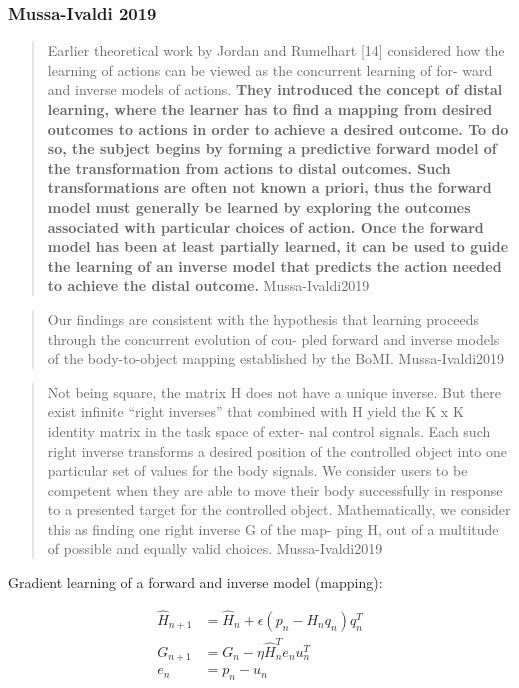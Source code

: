 \documentclass[../main.tex]{subfiles}
\begin{document}
{{{{{{{{{{{\subsubsection{Mussa-Ivaldi 2019}\label{mussa-ivaldi-2019}

\begin{quote}
Earlier theoretical work by Jordan and Rumelhart {[}14{]} considered how
the learning of actions can be viewed as the concurrent learning of for-
ward and inverse models of actions. \textbf{They introduced the concept
of distal learning, where the learner has to find a mapping from desired
outcomes to actions in order to achieve a desired outcome. To do so, the
subject begins by forming a predictive forward model of the
transformation from actions to distal outcomes. Such transformations are
often not known a priori, thus the forward model must generally be
learned by exploring the outcomes associated with particular choices of
action. Once the forward model has been at least partially learned, it
can be used to guide the learning of an inverse model that predicts the
action needed to achieve the distal outcome.} Mussa-Ivaldi2019
\end{quote}

\begin{quote}
Our findings are consistent with the hypothesis that learning proceeds
through the concurrent evolution of cou- pled forward and inverse models
of the body-to-object mapping established by the BoMI. Mussa-Ivaldi2019
\end{quote}

\begin{quote}
Not being square, the matrix H does not have a unique inverse. But there
exist infinite ``right inverses'' that combined with H yield the K x K
identity matrix in the task space of exter- nal control signals. Each
such right inverse transforms a desired position of the controlled
object into one particular set of values for the body signals. We
consider users to be competent when they are able to move their body
successfully in response to a presented target for the controlled
object. Mathematically, we consider this as finding one right inverse G
of the map- ping H, out of a multitude of possible and equally valid
choices. Mussa-Ivaldi2019
\end{quote}

Gradient learning of a forward and inverse model (mapping):

\begin{align*}
    \hat{H}_{n+1} &= \hat{H}_n + \epsilon(p_n - H_nq_n)q_n^T  \\
    G_{n+1} &= G_n - \eta\hat{H}_n^Te_nu_n^T \\
    e_n &= p_n - u_n
\end{align*}

}}}}}}}}}}}
\end{document}
